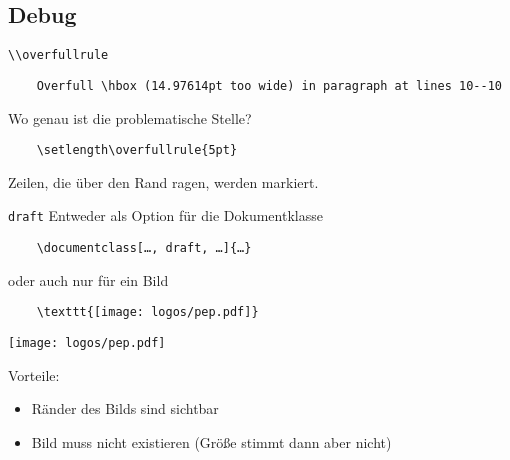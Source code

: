 \subsection{Debug}

\begin{frame}[fragile]{\lstinline+\\overfullrule+}

  \vspace{\baselineskip}
  \begin{lstlisting}
    Overfull \hbox (14.97614pt too wide) in paragraph at lines 10--10
  \end{lstlisting}
  Wo genau ist die problematische Stelle?

  \vspace{\baselineskip}
  \begin{lstlisting}
    \setlength\overfullrule{5pt}
  \end{lstlisting}

  \setlength\overfullrule{5pt}

  \vspace{\baselineskip}
  Zeilen, die über den Rand ragen, werden markiert.
\end{frame}

\begin{frame}[fragile]{\texttt{draft}}
  Entweder als Option für die Dokumentklasse
  \begin{lstlisting}
    \documentclass[…, draft, …]{…}
  \end{lstlisting}
  oder auch nur für ein Bild
  \begin{lstlisting}
    \texttt{[image: logos/pep.pdf]}
  \end{lstlisting}
  \texttt{[image: logos/pep.pdf]}

  Vorteile:
  \begin{itemize}
    \item Ränder des Bilds sind sichtbar
    \item Bild muss nicht existieren (Größe stimmt dann aber nicht)
  \end{itemize}
\end{frame}

